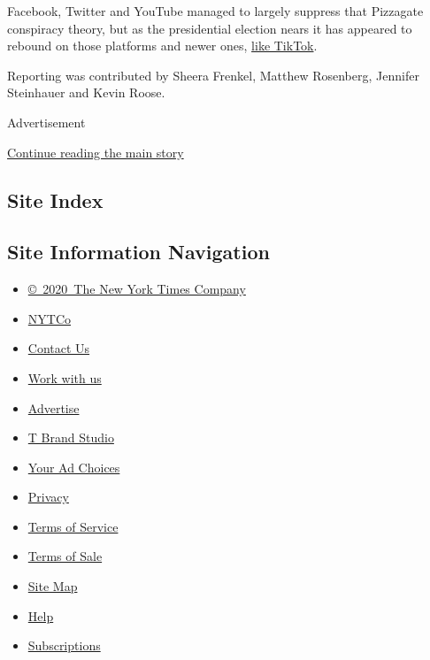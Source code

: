 Facebook, Twitter and YouTube managed to largely suppress that Pizzagate
conspiracy theory, but as the presidential election nears it has
appeared to rebound on those platforms and newer ones,
\href{https://www.nytimes.com/2020/06/29/technology/pizzagate-tiktok.html}{like
TikTok}.

Reporting was contributed by Sheera Frenkel, Matthew Rosenberg, Jennifer
Steinhauer and Kevin Roose.

Advertisement

\protect\hyperlink{after-bottom}{Continue reading the main story}

\hypertarget{site-index}{%
\subsection{Site Index}\label{site-index}}

\hypertarget{site-information-navigation}{%
\subsection{Site Information
Navigation}\label{site-information-navigation}}

\begin{itemize}
\tightlist
\item
  \href{https://help.nytimes.com/hc/en-us/articles/115014792127-Copyright-notice}{©~2020~The
  New York Times Company}
\end{itemize}

\begin{itemize}
\tightlist
\item
  \href{https://www.nytco.com/}{NYTCo}
\item
  \href{https://help.nytimes.com/hc/en-us/articles/115015385887-Contact-Us}{Contact
  Us}
\item
  \href{https://www.nytco.com/careers/}{Work with us}
\item
  \href{https://nytmediakit.com/}{Advertise}
\item
  \href{http://www.tbrandstudio.com/}{T Brand Studio}
\item
  \href{https://www.nytimes.com/privacy/cookie-policy\#how-do-i-manage-trackers}{Your
  Ad Choices}
\item
  \href{https://www.nytimes.com/privacy}{Privacy}
\item
  \href{https://help.nytimes.com/hc/en-us/articles/115014893428-Terms-of-service}{Terms
  of Service}
\item
  \href{https://help.nytimes.com/hc/en-us/articles/115014893968-Terms-of-sale}{Terms
  of Sale}
\item
  \href{https://spiderbites.nytimes.com}{Site Map}
\item
  \href{https://help.nytimes.com/hc/en-us}{Help}
\item
  \href{https://www.nytimes.com/subscription?campaignId=37WXW}{Subscriptions}
\end{itemize}
